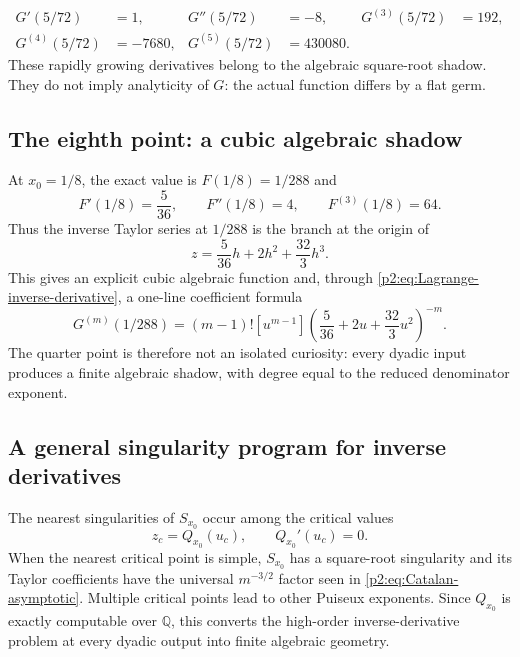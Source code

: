 \documentclass[11pt,oneside]{article}
\numberwithin{equation}{section}
\theoremstyle{definition}
\theoremstyle{remark}
\newcommand{\Q}{\mathbb Q}
\newcommand{\InvF}{G}
\begin{document}
\begin{example}
\begin{align*}
 \InvF'(5/72)&=1,
 & \InvF''(5/72)&=-8,
 & \InvF^{(3)}(5/72)&=192,\\
 \InvF^{(4)}(5/72)&=-7680,
 & \InvF^{(5)}(5/72)&=430080.
\end{align*}
These rapidly growing derivatives belong to the algebraic square-root shadow.  They do not imply
analyticity of $\InvF$: the actual function differs by a flat germ.
\end{example}

\subsection{The eighth point: a cubic algebraic shadow}

At $x_0=1/8$, the exact value is $F(1/8)=1/288$ and
\begin{equation}
 F'(1/8)=\frac5{36},
 \qquad F''(1/8)=4,
 \qquad F^{(3)}(1/8)=64.
 \label{p2:eq:eighth-jet}
\end{equation}
Thus the inverse Taylor series at $1/288$ is the branch at the origin of
\begin{equation}
 z=\frac5{36}h+2h^2+\frac{32}{3}h^3.
 \label{p2:eq:eighth-cubic}
\end{equation}
This gives an explicit cubic algebraic function and, through
\eqref{p2:eq:Lagrange-inverse-derivative}, a one-line coefficient formula
\begin{equation}
 \InvF^{(m)}(1/288)
 =(m-1)![u^{m-1}]
 \left(\frac5{36}+2u+\frac{32}{3}u^2\right)^{-m}.
 \label{p2:eq:eighth-coeff}
\end{equation}
The quarter point is therefore not an isolated curiosity: every dyadic input produces a finite
algebraic shadow, with degree equal to the reduced denominator exponent.

\subsection{A general singularity program for inverse derivatives}

The nearest singularities of $S_{x_0}$ occur among the critical values
\begin{equation}
 z_c=Q_{x_0}(u_c),
 \qquad Q_{x_0}'(u_c)=0.
 \label{p2:eq:critical-values}
\end{equation}
When the nearest critical point is simple, $S_{x_0}$ has a square-root singularity and its Taylor
coefficients have the universal $m^{-3/2}$ factor seen in \eqref{p2:eq:Catalan-asymptotic}.  Multiple
critical points lead to other Puiseux exponents.  Since $Q_{x_0}$ is exactly computable over $\Q$,
this converts the high-order inverse-derivative problem at every dyadic output into finite algebraic
geometry.
\end{document}
